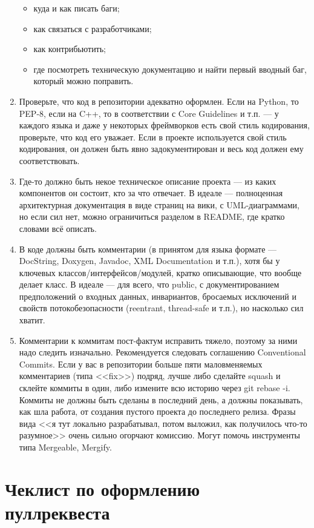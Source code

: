 \documentclass[a5paper]{article}
\begin{document}
\begin{enumerate}
    \begin{itemize}
        \item куда и как писать баги;
        \item как связаться с разработчиками;
        \item как контрибьютить;
        \item где посмотреть техническую документацию и найти первый вводный баг, который можно поправить.
    \end{itemize}
    \item Проверьте, что код в репозитории адекватно оформлен. Если на Python, то PEP-8, если на C++, то в соответствии с Core Guidelines и т.п. --- у каждого языка и даже у некоторых фреймворков есть свой стиль кодирования, проверьте, что код его уважает. Если в проекте используется свой стиль кодирования, он должен быть явно задокументирован и весь код должен ему соответствовать.
    \item Где-то должно быть некое техническое описание проекта --- из каких компонентов он состоит, кто за что отвечает. В идеале --- полноценная архитектурная документация в виде страниц на вики, с UML-диаграммами, но если сил нет, можно ограничиться разделом в README, где кратко словами всё описать.
    \item В коде должны быть комментарии (в принятом для языка формате --- DocString, Doxygen, Javadoc, XML Documentation и т.п.), хотя бы у ключевых классов/интерфейсов/модулей, кратко описывающие, что вообще делает класс. В идеале --- для всего, что public, с документированием предположений о входных данных, инвариантов, бросаемых исключений и свойств потокобезопасности (reentrant, thread-safe и т.п.), но насколько сил хватит.
    \item Комментарии к коммитам пост-фактум исправить тяжело, поэтому за ними надо следить изначально. Рекомендуется следовать соглашению Conventional Commits. Если у вас в репозитории больше пяти маловменяемых комментариев (типа <<fix>>) подряд, лучше либо сделайте squash и склейте коммиты в один, либо измените всю историю через git rebase -i. Коммиты не должны быть сделаны в последний день, а должны показывать, как шла работа, от создания пустого проекта до последнего релиза. Фразы вида <<я тут локально разрабатывал, потом выложил, как получилось что-то разумное>> очень сильно огорчают комиссию. Могут помочь инструменты типа Mergeable, Mergify.
\end{enumerate}

\section*{Чеклист по оформлению пуллреквеста}
\end{document}
